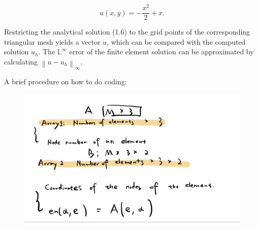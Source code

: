 \documentclass{article}
\begin{document}
\begin{equation*}
u(x, y)=-\frac{x^{2}}{2}+x.
\end{equation*}

Restricting the analytical solution (1.6) to the grid points of the corresponding triangular mesh yields a vector \( u \), which can be compared with the computed solution \( u_{h} \). The \( \mathbb{L}^{\infty} \) error of the finite element solution can be approximated by calculating \( \left\|u-u_{h}\right\|_{\infty} \).



\vspace{5mm}

A brief procedure on how to do coding:
\begin{figure}[H]
    \centering
\includegraphics[scale=0.2]{IMG_9C01D8EECCB6-1.jpeg}
\end{figure}
\end{document}
